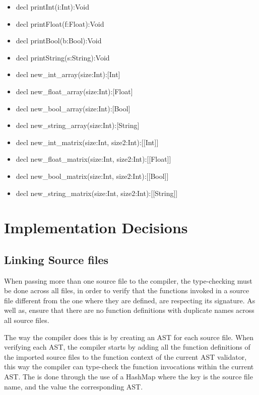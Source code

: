 \documentclass[12pt]{article}
\begin{document}
\begin{itemize}
		\item decl printInt(i:Int):Void
        \item decl printFloat(f:Float):Void
        \item decl printBool(b:Bool):Void
        \item decl printString(s:String):Void
        \item decl new\_int\_array(size:Int):[Int]
        \item decl new\_float\_array(size:Int):[Float]
        \item decl new\_bool\_array(size:Int):[Bool]
        \item decl new\_string\_array(size:Int):[String]
        \item decl new\_int\_matrix(size:Int, size2:Int):[[Int]]
        \item decl new\_float\_matrix(size:Int, size2:Int):[[Float]]
        \item decl new\_bool\_matrix(size:Int, size2:Int):[[Bool]]
        \item decl new\_string\_matrix(size:Int, size2:Int):[[String]]       

\end{itemize}

\newpage


\section{Implementation Decisions}
\subsection{Linking Source files}
When passing more than one source file to the compiler, the type-checking must be done across all files, in order to verify that the functions invoked in a source file different from the one where they are defined, are respecting its signature. As well as, ensure that there are no function definitions with duplicate names across all source files.

The way the compiler does this is by creating an AST for each source file. When verifying each AST, the compiler starts by adding all the function definitions of the imported source files to the function context of the current AST validator, this way the compiler can type-check the function invocations within the current AST. The is done through the use of a HashMap where the key is the source file name, and the value the corresponding AST.
\end{document}
